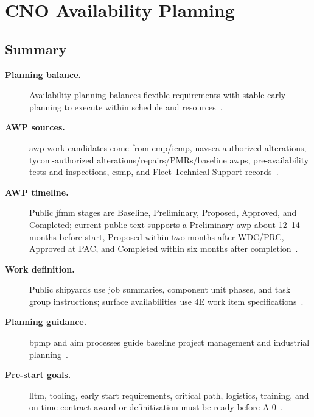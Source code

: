 \documentclass[../main.tex]{subfiles}
\begin{document}
\section{CNO Availability Planning}

\subsection{Summary}
\begin{description}
  \item[\textbf{Planning balance.}] Availability planning balances flexible requirements with stable early planning to execute within schedule and resources~\autocite{edo-4-2-1-cno-availability-planning-2025}.
  \item[\textbf{AWP sources.}] \ac{awp} work candidates come from \ac{cmp}/\ac{icmp}, \ac{navsea}-authorized alterations, \ac{tycom}-authorized alterations/repairs/PMRs/baseline \acp{awp}, pre-availability tests and inspections, \ac{csmp}, and Fleet Technical Support records~\autocite{COMFLTFORCOMINST4790-3,edo-4-2-1-cno-availability-planning-2025}.
  \item[\textbf{AWP timeline.}] Public \ac{jfmm} stages are Baseline, Preliminary, Proposed, Approved, and Completed; current public text supports a Preliminary \ac{awp} about 12--14 months before start, Proposed within two months after WDC/PRC, Approved at PAC, and Completed within six months after completion~\autocite{COMFLTFORCOMINST4790-3,edo-4-2-1-cno-availability-planning-2025}.
  \item[\textbf{Work definition.}] Public shipyards use job summaries, component unit phases, and task group instructions; surface availabilities use 4E work item specifications~\autocite{edo-4-2-1-cno-availability-planning-2025}.
  \item[\textbf{Planning guidance.}] \ac{bpmp} and \ac{aim} processes guide baseline project management and industrial planning~\autocite{edo-4-2-1-cno-availability-planning-2025}.
  \item[\textbf{Pre-start goals.}] \ac{lltm}, tooling, early start requirements, critical path, logistics, training, and on-time contract award or definitization must be ready before A-0~\autocite{edo-4-2-1-cno-availability-planning-2025}.
\end{description}
\end{document}
